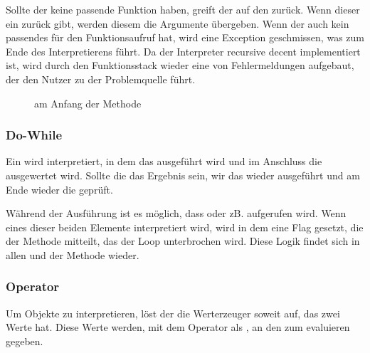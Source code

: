 {{      Sollte der  keine passende Funktion haben, greift der  auf den  zurück. Wenn dieser ein  zurück gibt, werden diesem die Argumente übergeben. Wenn der  auch kein passendes  für den Funktionsaufruf hat, wird eine Exception geschmissen, was zum Ende des Interpretierens führt. Da der Interpreter recursive decent implementiert ist, wird durch den Funktionsstack wieder eine  von Fehlermeldungen aufgebaut, der den Nutzer zu der Problemquelle führt.

      \begin{figure}[H]
        \centering
        \caption{ am Anfang der  Methode}
        \label{fig:int8}
      \end{figure}

    \subsubsection{Do-While}
    \label{sssec:Do-While}
      Ein  wird interpretiert, in dem das  ausgeführt wird und im Anschluss die  ausgewertet wird. Sollte die das Ergebnis  sein, wir das  wieder ausgeführt und am Ende wieder die  geprüft.

      Während der Ausführung ist es möglich, dass  oder zB.  aufgerufen wird. Wenn eines dieser beiden Elemente interpretiert wird, wird in dem  eine Flag gesetzt, die der  Methode mitteilt, das der Loop unterbrochen wird. Diese Logik findet sich in allen  und der  Methode wieder.

    \subsubsection{Operator}
    \label{sssec:Operator}
      Um  Objekte zu interpretieren, löst der  die Werterzeuger soweit auf, das zwei  Werte hat. Diese Werte werden, mit dem Operator als , an den  zum evaluieren gegeben.

}}

